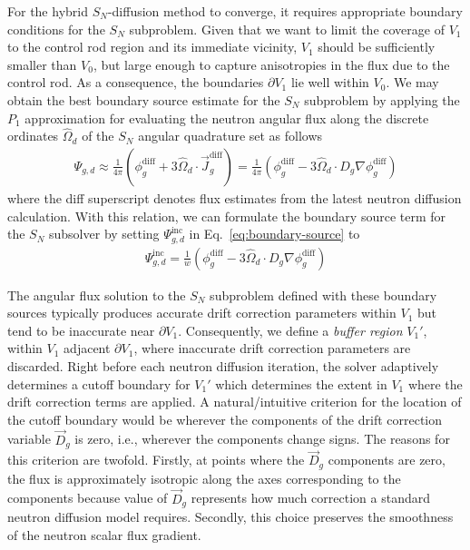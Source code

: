 \documentclass[letterpaper]{mc2025}
\begin{document}
For the hybrid $S_N$-diffusion method to converge, it requires appropriate boundary conditions for
the $S_N$ subproblem.
Given that we want to limit the coverage of $V_1$ to the control rod region and its
immediate vicinity, $V_1$ should be sufficiently smaller than $V_0$, but large enough to capture
anisotropies in the flux due to the control rod. As a consequence, the boundaries $\partial V_1$ 
lie well within $V_0$. We may obtain the best boundary source estimate for the $S_N$ subproblem by
applying the $P_1$ approximation for evaluating the neutron angular flux along
the discrete ordinates $\hat{\Omega}_d$ of the $S_N$ angular quadrature set as follows
%
\begin{align}
  \Psi_{g,d} \approx \frac{1}{4\pi}\left(\phi^\text{diff}_g+3\hat{\Omega}_d\cdot
  \vec{J}^\text{diff}_g\right)
  =\frac{1}{4\pi}\left(\phi^\text{diff}_g-3\hat{\Omega}_d\cdot D_g\nabla\phi^\text{diff}_g\right)
\end{align}
%
where the diff superscript denotes flux estimates from the latest neutron diffusion calculation.
With this relation, we can formulate the boundary source term for the $S_N$ subsolver by setting
$\Psi^\text{inc}_{g,d}$ in Eq.\ \ref{eq:boundary-source} to
%
\begin{gather}
  \Psi^\text{inc}_{g,d} = \frac{1}{w}
  \left(\phi^\text{diff}_g-3\hat{\Omega}_d\cdot D_g\nabla\phi^\text{diff}_g\right)
\end{gather}

The angular flux solution to the $S_N$ subproblem defined with these boundary sources typically
produces accurate drift correction parameters within $V_1$ but tend to be inaccurate
near $\partial V_1$. Consequently, we define a \textit{buffer region}
$V_1'$, within $V_1$ adjacent $\partial V_1$, where inaccurate drift correction parameters are
discarded. Right before each
neutron diffusion iteration, the solver adaptively determines a cutoff boundary for $V_1'$ which
determines the extent in $V_1$ where the drift correction terms are applied.
A natural/intuitive criterion for the location of the cutoff boundary
would be wherever the components of the drift correction variable $\vec{D}_g$ is zero, i.e.,
wherever the components change signs. The reasons for this criterion are twofold. Firstly, at
points where the $\vec{D}_g$ components are zero, the flux is approximately isotropic along the
axes corresponding to the components because value of $\vec{D}_g$ represents how much correction a
standard neutron diffusion model requires. Secondly, this choice preserves the smoothness of the
neutron scalar flux gradient.
\end{document}
